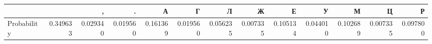 \begin{tabular}{lrrrrrrrrrrrr}
\toprule
 &   & , & . & А & Г & Л & Ж & Е & У & М & Ц & Р \\
\midrule
Probability & 0.349633 & 0.029340 & 0.019560 & 0.161369 & 0.019560 & 0.056235 & 0.007335 & 0.105134 & 0.044010 & 0.102689 & 0.007335 & 0.097800 \\
\bottomrule
\end{tabular}
